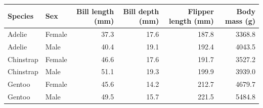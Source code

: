 \begin{tabular}{llrrrr}
\toprule
Species & Sex & Bill length (mm) & Bill depth (mm) & Flipper length (mm) & Body mass (g) \\ 
\midrule
Adelie & Female & 37.3 & 17.6 & 187.8 & 3368.8 \\
Adelie & Male & 40.4 & 19.1 & 192.4 & 4043.5 \\
Chinstrap & Female & 46.6 & 17.6 & 191.7 & 3527.2 \\
Chinstrap & Male & 51.1 & 19.3 & 199.9 & 3939.0 \\
Gentoo & Female & 45.6 & 14.2 & 212.7 & 4679.7 \\
Gentoo & Male & 49.5 & 15.7 & 221.5 & 5484.8 \\
\bottomrule
\end{tabular}
